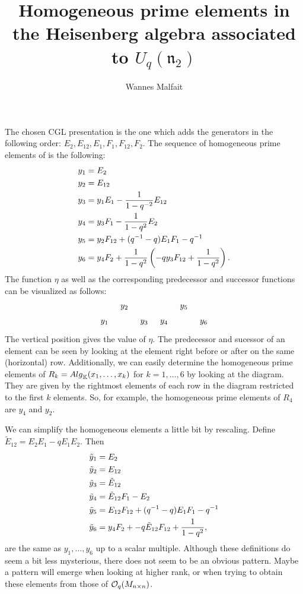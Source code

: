\documentclass{article}
\title{Homogeneous prime elements in the Heisenberg algebra associated to $U_q (\mathfrak{n}_2)$}
\author{Wannes Malfait}
\begin{document}
\maketitle

The chosen CGL presentation is the one which adds the generators in the following order: $E_2, E_{12}, E_1, F_1, F_{12}, F_2$. The sequence of homogeneous prime elements of \cite[Theorem 3.6]{GoodearlYakimov2017QCA} is the following:
\begin{align*}
	y_1 &= E_2 \\
	y_2 &= E_{12} \\
	y_3 &= y_1 E_1 - \frac{1}{1- q^{-2}}E_{12} \\
	y_4 &= y_3 F_1 - \frac{1}{1-q^2} E_2\\
	y_5 &= y_2 F_{12} + (q^{-1} - q) E_1 F_1 - q ^{-1} \\
	y_6 &= y_4 F_2 + \frac{1}{1-q^2} \left(- q y_3 F_{12} + \frac{1}{1 - q^2} \right).
\end{align*}
The function $\eta$ as well as the corresponding predecessor and successor functions can be visualized as follows:
\begin{equation*}
	\begin{tikzcd}[sep=tiny]
    	& y_2 & & & y_5 \\
		y_1 & & y_3 & y_4 & & y_6
    \end{tikzcd}
\end{equation*}
The vertical position gives the value of $\eta$. The predecessor and sucessor of an element can be seen by looking at the element right before or after on the same (horizontal) row. Additionally, we can easily determine the homogeneous prime elements of $R_k = \mathop{Alg}_{\mathbb{K}} (x_1, \dots, x_k)$ for $k=1,\dots,6$ by looking at the diagram. They are given by the rightmost elements of each row in the diagram restricted to the first $k$ elements. So, for example, the homogeneous prime elements of $R_4$ are $y_4$ and $y_2$.

We can simplify the homogeneous elements a little bit by rescaling. Define $\tilde{E}_{12} = E_2 E_1 - q E_1 E_2$. Then
\begin{align*}
	\tilde{y}_1 &= E_2 \\
	\tilde{y}_2 &= E_{12} \\
	\tilde{y}_3 &= \tilde{E}_{12} \\
	\tilde{y}_4 &= \tilde{E}_{12} F_1 -  E_2\\
	\tilde{y}_5 &= E_{12} F_{12} + (q^{-1} - q) E_1 F_1 - q ^{-1} \\
	\tilde{y}_6 &= y_4 F_2 + - q \tilde{E}_{12} F_{12} + \frac{1}{1 - q^2},
\end{align*}
are the same as $y_1 , \dots, y_6$ up to a scalar multiple. Although these definitions do seem a bit less mysterious, there does not seem to be an obvious pattern. Maybe a pattern will emerge when looking at higher rank, or when trying to obtain these elements from those of $\mathcal{O}_q (M_{n \times n})$.





\end{document}
